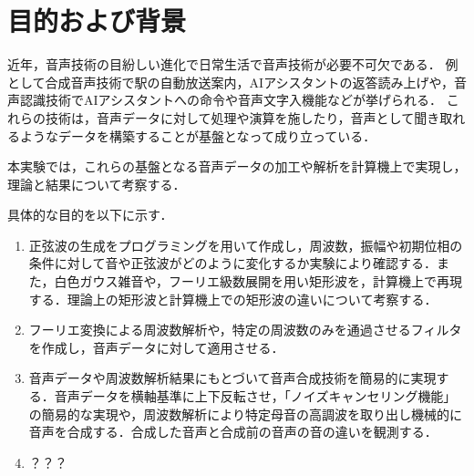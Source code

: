 \chapter{目的および背景}
近年，音声技術の目紛しい進化で日常生活で音声技術が必要不可欠である．
例として合成音声技術で駅の自動放送案内，AIアシスタントの返答読み上げや，音声認識技術でAIアシスタントへの命令や音声文字入機能などが挙げられる．
これらの技術は，音声データに対して処理や演算を施したり，音声として聞き取れるようなデータを構築することが基盤となって成り立っている．\par
本実験では，これらの基盤となる音声データの加工や解析を計算機上で実現し，理論と結果について考察する．\par
具体的な目的を以下に示す．
\begin{enumerate}
	\item 正弦波の生成をプログラミングを用いて作成し，周波数，振幅や初期位相の条件に対して音や正弦波がどのように変化するか実験により確認する．また，白色ガウス雑音や，フーリエ級数展開を用い矩形波を，計算機上で再現する．理論上の矩形波と計算機上での矩形波の違いについて考察する．
	\item フーリエ変換による周波数解析や，特定の周波数のみを通過させるフィルタを作成し，音声データに対して適用させる．
	\item 音声データや周波数解析結果にもとづいて音声合成技術を簡易的に実現する．音声データを横軸基準に上下反転させ，「ノイズキャンセリング機能」の簡易的な実現や，周波数解析により特定母音の高調波を取り出し機械的に音声を合成する．合成した音声と合成前の音声の音の違いを観測する．
	\item ？？？
\end{enumerate}

